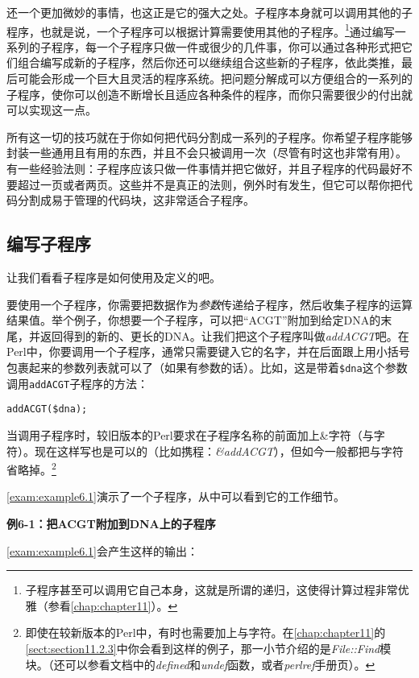 还一个更加微妙的事情，也这正是它的强大之处。子程序本身就可以调用其他的子程序，也就是说，一个子程序可以根据计算需要使用其他的子程序。\footnote{子程序甚至可以调用它自己本身，这就是所谓的递归，这使得计算过程非常优雅（参看\autoref{chap:chapter11}）。}通过编写一系列的子程序，每一个子程序只做一件或很少的几件事，你可以通过各种形式把它们组合编写成新的子程序，然后你还可以继续组合这些新的子程序，依此类推，最后可能会形成一个巨大且灵活的程序系统。把问题分解成可以方便组合的一系列的子程序，使你可以创造不断增长且适应各种条件的程序，而你只需要很少的付出就可以实现这一点。

所有这一切的技巧就在于你如何把代码分割成一系列的子程序。你希望子程序能够封装一些通用且有用的东西，并且不会只被调用一次（尽管有时这也非常有用）。有一些经验法则：子程序应该只做一件事情并把它做好，并且子程序的代码最好不要超过一页或者两页。这些并不是真正的法则，例外时有发生，但它可以帮你把代码分割成易于管理的代码块，这非常适合子程序。

\subsection{编写子程序}
让我们看看子程序是如何使用及定义的吧。

要使用一个子程序，你需要把数据作为\textit{参数}传递给子程序，然后收集子程序的运算结果值。举个例子，你想要一个子程序，可以把“ACGT”附加到给定DNA的末尾，并返回得到的新的、更长的DNA。让我们把这个子程序叫做\textit{addACGT}吧。在Perl中，你要调用一个子程序，通常只需要键入它的名字，并在后面跟上用小括号包裹起来的参数列表就可以了（如果有参数的话）。比如，这是带着\verb|$dna|这个参数调用\verb|addACGT|子程序的方法：

\begin{lstlisting}
addACGT($dna);
\end{lstlisting}

当调用子程序时，较旧版本的Perl要求在子程序名称的前面加上\&字符（与字符）。现在这样写也是可以的（比如携程：\textit{\&addACGT}），但如今一般都把与字符省略掉。\footnote{即使在较新版本的Perl中，有时也需要加上与字符。在\autoref{chap:chapter11}的\autoref{sect:section11.2.3}中你会看到这样的例子，那一小节介绍的是\textit{File::Find}模块。（还可以参看文档中的\textit{defined}和\textit{undef}函数，或者\textit{perlref}手册页）。}

\autoref{exam:example6.1}演示了一个子程序，从中可以看到它的工作细节。

\textbf{例6-1：把ACGT附加到DNA上的子程序}


\autoref{exam:example6.1}会产生这样的输出：

